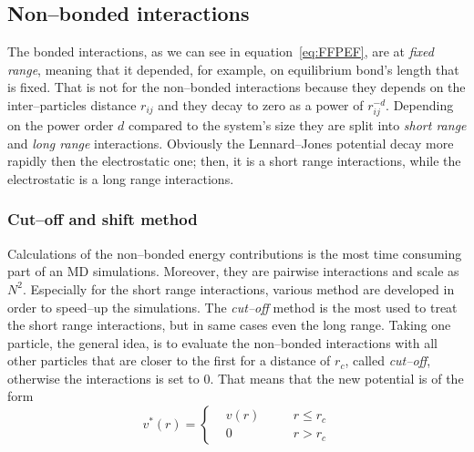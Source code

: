 \subsection{Non--bonded interactions}
The bonded interactions, as we can see in equation~\eqref{eq:FFPEF}, are at \textit{fixed range}, meaning that it depended, for example, on equilibrium bond's length that is fixed. That is not for the non--bonded interactions because they depends on the inter--particles distance $r_{ij}$ and they decay to zero as a power of $r_{ij}^{-d}$. Depending on the power order $d$ compared to the system's size they are split into \textit{short range} and \textit{long range} interactions. Obviously the Lennard--Jones potential decay more rapidly then the electrostatic one; then, it is a short range interactions, while the electrostatic is a long range interactions.

\subsubsection{Cut--off and shift method}
Calculations of the non--bonded energy contributions is the most time consuming part of an \ac{MD} simulations. Moreover, they are pairwise interactions and scale as $N^2$. Especially for the short range interactions, various method are developed in order to speed--up the simulations. The \textit{cut--off} method is the most used to treat the short range interactions, but in same cases even the long range. Taking one particle, the general idea, is to evaluate the non--bonded interactions with all other particles that are closer to the first for a distance of $r_c$, called \textit{cut--off}, otherwise the interactions is set to $0$. That means that the new potential is of the form
\begin{equation*}
v^*(r) = \left \{
	\begin{aligned}
&v(r) & \quad & r \le r_c \\
&0    & \quad & r >   r_c
	\end{aligned} \right .
\end{equation*}

